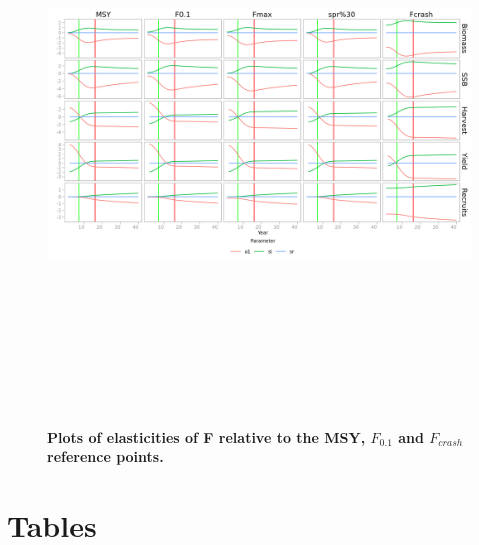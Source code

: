 \documentclass[10pt]{article}
\begin{document}
\begin{figure}[!ht]
\begin{center}
\includegraphics[height=6in, width=6in]{fig5.png}
\end{center}
\caption{\bf{Plots of elasticities of F relative to the MSY, $F_{0.1}$ and $F_{crash}$ reference points.}}
\label{fig:elasf}
\end{figure}


\section*{Tables}
\end{document}

